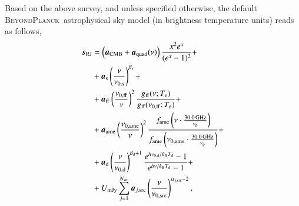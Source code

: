 \documentclass[onecolumn]{aa}
\newcommand{\s}[0]{\vec{s}}
\renewcommand{\a}[0]{\vec{a}}
\newcommand{\Te}[0]{T_{e}}
\newcommand{\BP}{\textsc{BeyondPlanck}}
\newcommand{\e}{\mathrm e}
\def\Tdust{\ifmmode T_\mathrm{d}\else $T_{\mathrm{d}}$\fi}
\def\bdust{\ifmmode \beta_\mathrm{d}\else $\beta_{\mathrm{d}}$\fi}
\def\bsynch{\ifmmode \beta_\mathrm{s}\else $\beta_{\mathrm{s}}$\fi}
\def\nuzeros{\ifmmode \nu_{0,\mathrm{s}}\else $\nu_{0,\mathrm{s}}$\fi}
\def\nuzeroff{\ifmmode \nu_{0,\mathrm{ff}}\else $\nu_{0,\mathrm{ff}}$\fi}
\def\nuzerod{\ifmmode \nu_{0,\mathrm{d}}\else $\nu_{0,\mathrm{d}}$\fi}
\def\nuzeroame{\ifmmode \nu_{0,\mathrm{ame}}\else $\nu_{0,\mathrm{ame}}$\fi}
\def\nuzerosrc{\ifmmode \nu_{0,\mathrm{src}}\else $\nu_{0,\mathrm{src}}$\fi}
\def\nup{\ifmmode \nu_{\mathrm{p}}\else $\nu_{\mathrm{p}}$\fi}
\def\Te{\ifmmode T_{\mathrm{e}}\else $T_{\mathrm{e}}$\fi}
\def\kB{\ifmmode k_\mathrm{B}\else $k_{\mathrm{B}}$\fi}
\begin{document}
Based on the above survey, and unless specified otherwise, the default
\BP\ astrophysical sky model (in brightness temperature units) reads as follows,
\begin{align}
  \vec{s}_{\mathrm{RJ}} &= \left(\vec{a}_{\mathrm{CMB}}+\vec{a}_{\mathrm{quad}}(\nu)\right) \frac{x^2 e^x}{(e^x -1)^2}+\label{eq:cmb_astsky}\\
  &+ \vec{a}_{\mathrm{s}} \left(\frac{\nu}{\nuzeros}\right)^{\bsynch} + \label{eq:synch_astsky}\\
  &+ \vec{a}_{\mathrm{ff}} \left(\frac{\nuzeroff}{\nu}\right)^2 \frac{g_{\mathrm{ff}}(\nu;\Te) }{g_{\mathrm{ff}}(\nuzeroff;\Te)} +\label{eq:ff_astsky}\\
  &+ \vec{a}_{\mathrm{ame}} \left(\frac{\nuzeroame}{\nu}\right)^2 \frac{f_{\mathrm{ame}} \left(\nu\cdot \frac{30.0\,\mathrm{GHz}}{\nup}\right)}{f_{\mathrm{ame}} \left(\nuzeroame\cdot \frac{30.0\,\mathrm{GHz}}{\nup}\right)}+\label{eq:ame_astsky}  \\ 
  &+ \vec{a}_{\mathrm{d}} \left(\frac{\nu}{\nuzerod}\right)^{\bdust+1} \frac{e^{h\nuzerod/\kB\Tdust}-1}{e^{h\nu/\kB\Tdust}-1}+ \label{eq:dust_astsky}\\
  &+ U_{\mathrm{mJy}} \sum_{j=1}^{N_{\mathrm{src}}} \vec{a}_{j,\mathrm{src}} \left(\frac{\nu}{\nuzerosrc}\right)^{\alpha_{j,\mathrm{src}}-2}, \label{eq:sum_ptsrc}
\end{align}
\end{document}

